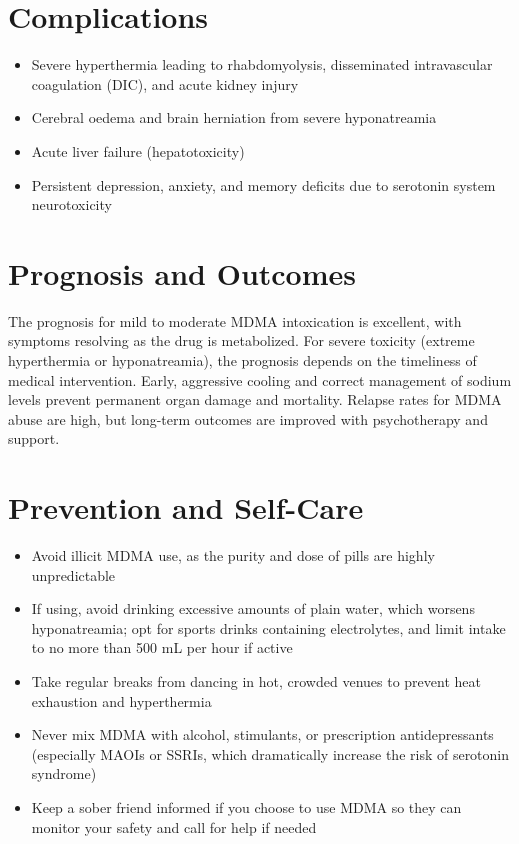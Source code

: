 \section*{Complications}
\begin{itemize}
    \item Severe hyperthermia leading to rhabdomyolysis, disseminated intravascular coagulation (DIC), and acute kidney injury
    \item Cerebral oedema and brain herniation from severe hyponatreamia
    \item Acute liver failure (hepatotoxicity)
    \item Persistent depression, anxiety, and memory deficits due to serotonin system neurotoxicity
\end{itemize}

\section*{Prognosis and Outcomes}
The prognosis for mild to moderate MDMA intoxication is excellent, with symptoms resolving as the drug is metabolized. For severe toxicity (extreme hyperthermia or hyponatreamia), the prognosis depends on the timeliness of medical intervention. Early, aggressive cooling and correct management of sodium levels prevent permanent organ damage and mortality. Relapse rates for MDMA abuse are high, but long-term outcomes are improved with psychotherapy and support.

\section*{Prevention and Self-Care}
\begin{itemize}
    \item Avoid illicit MDMA use, as the purity and dose of pills are highly unpredictable
    \item If using, avoid drinking excessive amounts of plain water, which worsens hyponatreamia; opt for sports drinks containing electrolytes, and limit intake to no more than 500 mL per hour if active
    \item Take regular breaks from dancing in hot, crowded venues to prevent heat exhaustion and hyperthermia
    \item Never mix MDMA with alcohol, stimulants, or prescription antidepressants (especially MAOIs or SSRIs, which dramatically increase the risk of serotonin syndrome)
    \item Keep a sober friend informed if you choose to use MDMA so they can monitor your safety and call for help if needed
\end{itemize}


